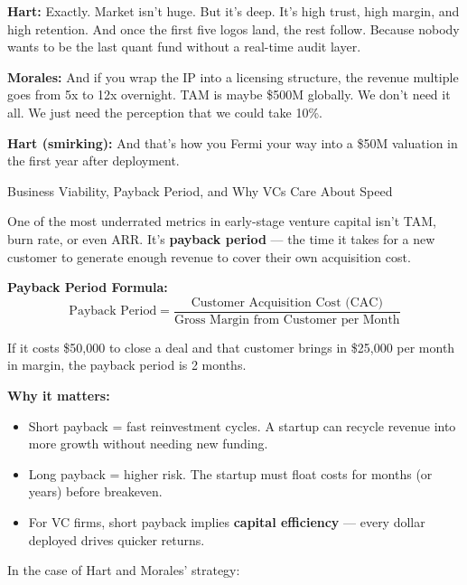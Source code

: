 \textbf{Hart:}  
Exactly. Market isn’t huge. But it’s deep. It's high trust, high margin, and high retention.  
And once the first five logos land, the rest follow. Because nobody wants to be the last quant fund without a real-time 
audit layer.

\textbf{Morales:}  
And if you wrap the IP into a licensing structure, the revenue multiple goes from 5x to 12x overnight.
TAM is maybe \$500M globally. We don’t need it all.  
We just need the perception that we could take 10\%.

\textbf{Hart (smirking):}  
And that’s how you Fermi your way into a \$50M valuation in the first year after deployment.

\medskip

\begin{TechnicalSidebar}{Business Viability, Payback Period, and Why VCs Care About Speed}

  One of the most underrated metrics in early-stage venture capital isn’t TAM, burn rate, or even ARR.  
  It’s \textbf{payback period} — the time it takes for a new customer to generate enough revenue to cover their own acquisition cost.
  
  \medskip
  
  \textbf{Payback Period Formula:}
  \[
  \text{Payback Period} = \frac{\text{Customer Acquisition Cost (CAC)}}{\text{Gross Margin from Customer per Month}}
  \]
  
  \medskip
  
  If it costs \$50,000 to close a deal and that customer brings in \$25,000 per month in margin,  
  the payback period is 2 months.
  
  \medskip
  
  \textbf{Why it matters:}
  
  \begin{itemize}
    \item Short payback = fast reinvestment cycles. A startup can recycle revenue into more growth without needing new funding.
    \item Long payback = higher risk. The startup must float costs for months (or years) before breakeven.
    \item For VC firms, short payback implies \textbf{capital efficiency} — every dollar deployed drives quicker returns.
  \end{itemize}
  
  \medskip
  
  In the case of Hart and Morales’ strategy:


\end{TechnicalSidebar}
